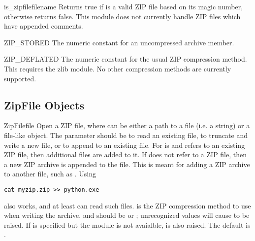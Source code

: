 \begin{funcdesc}{is_zipfile}{filename}
  Returns true if  is a valid ZIP file based on its magic
  number, otherwise returns false.  This module does not currently
  handle ZIP files which have appended comments.
\end{funcdesc}

\begin{datadesc}{ZIP_STORED}
  The numeric constant for an uncompressed archive member.
\end{datadesc}

\begin{datadesc}{ZIP_DEFLATED}
  The numeric constant for the usual ZIP compression method.  This
  requires the zlib module.  No other compression methods are
  currently supported.
\end{datadesc}


\begin{seealso}

\end{seealso}


\subsection{ZipFile Objects \label{zipfile-objects}}

\begin{classdesc}{ZipFile}{file} 
  Open a ZIP file, where  can be either a path to a file
  (i.e. a string) or a file-like object.  The  parameter
  should be  to read an existing file,  to
  truncate and write a new file, or  to append to an
  existing file.  For  is  and 
  refers to an existing ZIP file, then additional files are added to
  it.  If  does not refer to a ZIP file, then a new ZIP
  archive is appended to the file.  This is meant for adding a ZIP
  archive to another file, such as .  Using

\begin{verbatim}
cat myzip.zip >> python.exe
\end{verbatim}

  also works, and at least  can read such files.
   is the ZIP compression method to use when writing
  the archive, and should be  or
  ; unrecognized values will cause
   to be raised.  If 
  is specified but the  module is not avaialble,
   is also raised.  The default is
  . 
\end{classdesc}

